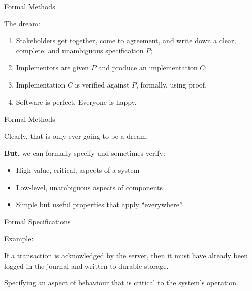 \documentclass[xetex,aspectratio=169,14pt,hyperref={pdfpagelabels=true,pdflang={en-GB}}]{beamer}
\begin{document}
\begin{frame}
  {Formal Methods}

  The dream:

  \bigskip

  \begin{enumerate}
  \item Stakeholders get together, come to agreement, and write down a
    clear, complete, and unambiguous specification $P$;
  \item Implementors are given $P$ and produce an implementation $C$;
  \item Implementation $C$ is verified against $P$, formally, using proof.
  \item Software is perfect. Everyone is happy.
  \end{enumerate}
\end{frame}

\begin{frame}
  {Formal Methods}

  Clearly, that is only ever going to be a dream.

  \bigskip
  \pause

  {\bf But,} we can formally specify and sometimes verify:

  \medskip

  \begin{itemize}
  \item High-value, critical, aspects of a system
  \item Low-level, unambiguous aspects of components
  \item Simple but useful properties that apply ``everywhere''
  \end{itemize}

\end{frame}

\begin{frame}
  {Formal Specifications}

  Example:

  \bigskip

  \begin{center}
    If a transaction is acknowledged by the server, then it must have
    already been logged in the journal and written to durable storage.
  \end{center}

  \bigskip

  Specifying an aspect of behaviour that is critical to the system's
  operation.
\end{frame}
\end{document}
